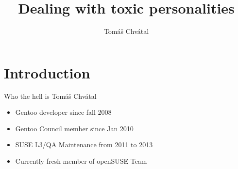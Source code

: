 \documentclass{beamer}
\author{Tom\'{a}\v{s} Chv\'{a}tal\newline {\small openSUSE Team}}
\title{Dealing with toxic personalities}
\begin{document}
\begin{frame}[t,plain]
\titlepage
\end{frame}

\section{Introduction}

\begin{frame}{Who the hell is Tomáš Chvátal}
	\begin{itemize}
	\item Gentoo developer since fall 2008
	\item Gentoo Council member since Jan 2010
	\item SUSE L3/QA Maintenance from 2011 to 2013
	\item Currently fresh member of openSUSE Team
	\end{itemize}
\end{frame}
\end{document}
